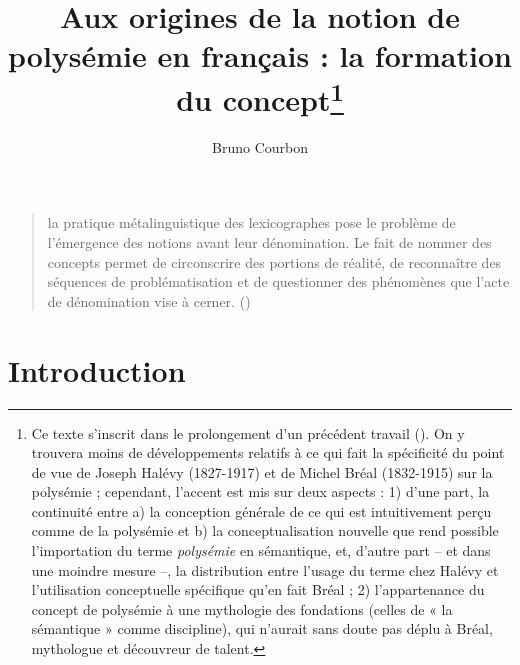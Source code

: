 \documentclass[output=paper]{langsci/langscibook}
\author{Bruno Courbon\affiliation{Université Laval}\orcid{}}
\title{Aux origines de la notion de polysémie en français : la formation du concept\footnote{\textrm{Ce texte s’inscrit dans le prolongement d’un précédent travail (\citealt{courbon_sur_2015}). On y trouvera moins de développements relatifs à ce qui fait la spécificité du point de vue de Joseph Halévy (1827-1917) et de Michel Bréal (1832-1915) sur la \is{polysémie}polysémie ; cependant, l’accent est mis sur deux aspects : 1) d’une part, la continuité entre a) la conception générale de ce qui est intuitivement perçu comme de la \is{polysémie}polysémie et b) la conceptualisation nouvelle que rend possible l’importation du \is{terme}terme \is{polysémie}\textit{polysémie} en sémantique, et, d’autre part – et dans une moindre mesure –, la distribution entre l’usage du terme chez Halévy et l’utilisation conceptuelle spécifique qu’en fait Bréal ; 2) l’appartenance du concept de \is{polysémie}polysémie à une mythologie des fondations (celles de « la sémantique » comme discipline), qui n’aurait sans doute pas déplu à Bréal, mythologue et découvreur de talent.}}}
\begin{document}
\maketitle

\begin{quote}
    \begin{small}
[…] la pratique métalinguistique des lexicographes pose le problème de l’émergence des notions avant leur dénomination. Le fait de nommer des concepts permet de circonscrire des portions de réalité, de reconnaître des séquences de problématisation et de questionner des phénomènes que l’acte de dénomination vise à cerner. (\citealt[23]{bisconti_sens_2016})
    \end{small}
\end{quote}
     

\section*{Introduction} 
\end{document}
